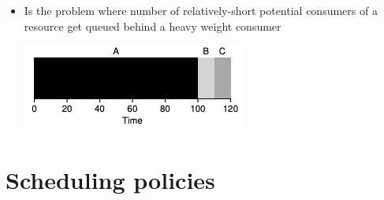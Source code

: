 \documentclass[12pt]{article}
\begin{document}
\begin{itemize}
    \item Is the problem where number of relatively-short potential consumers
    of a resource get queued behind a heavy weight consumer

    \bigskip

    \begin{center}
    \includegraphics[width=0.7\linewidth]{../images/midterm_2_solution_5.png}
    \end{center}
\end{itemize}

\section{Scheduling policies}
\end{document}
